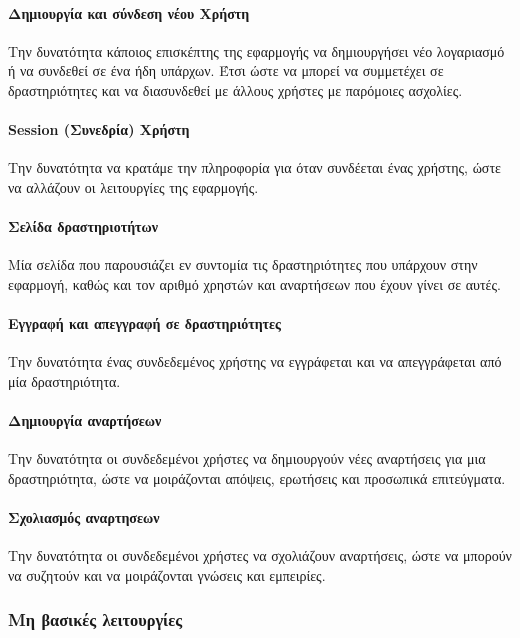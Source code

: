 \documentclass[nonacm, language=english, language=greek]{acmart}
\newcommand{\en}[1]{\textlatin{#1}}
\begin{document}
\paragraph{Δημιουργία και σύνδεση νέου Χρήστη}
Την δυνατότητα κάποιος επισκέπτης της εφαρμογής να δημιουργήσει νέο λογαριασμό ή να συνδεθεί σε ένα ήδη υπάρχων. Έτσι ώστε να μπορεί να συμμετέχει σε δραστηριότητες και να διασυνδεθεί με άλλους χρήστες με παρόμοιες ασχολίες.
 
\paragraph{\en{Session} (Συνεδρία) Χρήστη} 
Την δυνατότητα να κρατάμε την πληροφορία για όταν συνδέεται ένας χρήστης, ώστε να αλλάζουν οι λειτουργίες της εφαρμογής.
 
\paragraph{Σελίδα δραστηριοτήτων}
Μία σελίδα που παρουσιάζει εν συντομία τις δραστηριότητες που υπάρχουν στην εφαρμογή, καθώς και τον αριθμό χρηστών και αναρτήσεων που έχουν γίνει σε αυτές.
 
\paragraph{Εγγραφή και απεγγραφή σε δραστηριότητες}
Την δυνατότητα ένας συνδεδεμένος χρήστης να εγγράφεται και να απεγγράφεται από μία δραστηριότητα.
 
\paragraph{Δημιουργία αναρτήσεων}
Την δυνατότητα οι συνδεδεμένοι χρήστες να δημιουργούν νέες αναρτήσεις για μια δραστηριότητα, ώστε να μοιράζονται απόψεις, ερωτήσεις και προσωπικά επιτεύγματα.
 
\paragraph{Σχολιασμός αναρτησεων}
Την δυνατότητα οι συνδεδεμένοι χρήστες να σχολιάζουν αναρτήσεις, ώστε να μπορούν να συζητούν και να μοιράζονται γνώσεις και εμπειρίες.
 
\subsubsection{Μη βασικές λειτουργίες}
\end{document}
